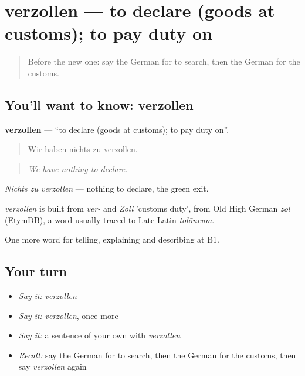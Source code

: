 \section[verzollen]{verzollen — to declare (goods at customs); to pay duty on}

\label{lesson:GE-C417-verzollen}



\begin{quote}
Before the new one: say the German for to search, then the German for the customs.
\end{quote}

\subsection*{You'll want to know: verzollen}
\textbf{verzollen} — \textquotedblleft{}to declare (goods at customs); to pay duty on\textquotedblright{}.

\begin{quote}
Wir haben nichts zu verzollen.
\end{quote}

\begin{quote}
\emph{We have nothing to declare.}
\end{quote}

\emph{Nichts zu verzollen} — nothing to declare, the green exit.

\begin{cousinweb}
\emph{verzollen} is built from \emph{ver-} and \emph{Zoll} 'customs duty', from Old High German \emph{zol} (EtymDB), a word usually traced to Late Latin \emph{tolōneum}.
\end{cousinweb}

\begin{grammarlens}[title={What you've built}]
One more word for telling, explaining and describing at B1.
\end{grammarlens}

\subsection*{Your turn}
\begin{itemize}
\raggedright
  \item \emph{Say it:} \emph{verzollen}
  \item \emph{Say it:} \emph{verzollen}, once more
  \item \emph{Say it:} a sentence of your own with \emph{verzollen}
  \item \emph{Recall:} say the German for to search, then the German for the customs, then say \emph{verzollen} again
\end{itemize}

